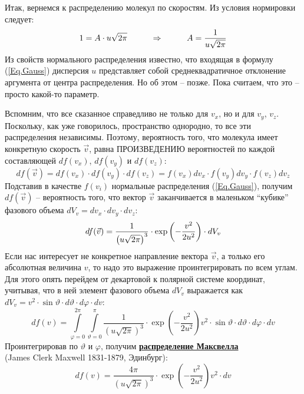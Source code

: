Итак, вернемся к распределению молекул по скоростям. Из условия нормировки следует:\vspace{-5mm}
\begin{equation}
1=A\cdot u\sqrt{2\pi}\hspace{10mm}\Rightarrow\hspace{10mm}A=\frac{1}{u\sqrt{2\pi}}
\end{equation}
Из свойств нормального распределения  известно, что входящая в формулу (\ref{Eq.Gauss}) дисперсия $u$ представляет собой среднеквадратичное отклонение аргу\-мен\-та от центра распределения.  Но об этом -- позже. Пока считаем, что это -- просто какой-то параметр.

Вспомним, что все сказанное справедливо не только для $v_x$, но и для $v_y$, $v_z$. Поскольку, как уже говорилось, пространство однородно, то все эти распределения независимы. Поэтому, вероятность того, что молекула имеет конкретную скорость $\vec{v}$, равна ПРОИЗВЕДЕНИЮ вероятностей по каждой составляющей $df(v_x)$, $df(v_y)$ и $df(v_z)$:
\begin{displaymath}
df(\vec{v})=df(v_x)\cdot df(v_y)\cdot df(v_z)
 =f(v_x)dv_x\cdot f(v_y)dv_y\cdot f(v_z)dv_z
\end{displaymath}
Подставив в качестве $f(v_i)$ нормальные распределения (\ref{Eq.Gauss}), получим $df(\vec{v})$ -- вероятность того, что вектор $\vec{v}$ заканчивается в маленьком ``кубике'' фазового объема $dV_v=dv_x\cdot dv_y\cdot dv_z$:\vspace{-2mm}
\begin{equation}\label{Eq.Maxwell_1_vec{v}}
df(\vec{v})
 =\frac{1}{\left(u\sqrt{2\pi}\right)^3}\cdot \exp\left(-\frac{v^2}{2u^2}\right)\cdot dV_v
\end{equation}
Если нас интересует не конкретное направление вектора $\vec{v}$, а только его абсолютная величина $v$, то надо это выражение проинтегрировать по всем углам. Для этого опять перейдем от декартовой к полярной системе ко\-ор\-ди\-нат, учитывая, что в ней элемент фазового объема $dV_v$ выражается как $dV_v=v^2\cdot\sin\vartheta\cdot d\vartheta\cdot d\varphi\cdot dv$:
\begin{displaymath}
df(v)=\int\limits_{\varphi=0}^{2\pi}\int\limits_{\vartheta=0}^\pi
 \frac{1}{\left(u\sqrt{2\pi}\right)^3}\cdot \exp\left(-\frac{v^2}{2u^2}\right)v^2\cdot\sin\vartheta\cdot d\vartheta\cdot d\varphi\cdot dv
\end{displaymath}
Проинтегрировав по $\vartheta$ и $\varphi$, получим \underline{\color{blue}\bf распределение Максвелла}\\ (James Clerk Maxwell 1831-1879, Эдинбург):
\begin{equation}\label{Eq.Maxwell_1}
df(v)= \frac{4\pi}{\left(u\sqrt{2\pi}\right)^3}\cdot \exp\left(-\frac{v^2}{2u^2}\right)v^2\cdot dv
\end{equation}

